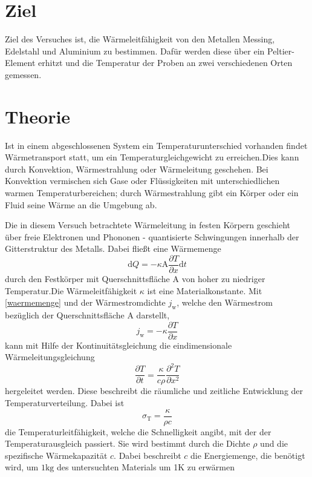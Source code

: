 \section{Ziel}
\label{sec:ziel}

Ziel des Versuches ist, die Wärmeleitfähigkeit von den Metallen Messing, Edelstahl und Aluminium zu bestimmen. Dafür werden diese über ein Peltier-Element erhitzt und die Temperatur der Proben an zwei verschiedenen Orten gemessen.

\section{Theorie}
\label{sec:theorie}

Ist in einem abgeschlossenen System ein Temperaturunterschied vorhanden findet Wärmetransport statt, um ein Temperaturgleichgewicht zu erreichen.Dies kann durch Konvektion, Wärmestrahlung oder Wärmeleitung geschehen. 
Bei Konvektion vermischen sich Gase oder Flüssigkeiten mit unterschiedlichen warmen Temperaturbereichen; durch Wärmestrahlung gibt ein Körper oder ein Fluid seine Wärme an die Umgebung ab.

Die in diesem Versuch betrachtete Wärmeleitung in festen Körpern geschieht über freie Elektronen und Phononen - quantisierte Schwingungen innerhalb der Gitterstruktur des Metalls.
Dabei fließt eine Wärmemenge
\begin{equation}
	\label{waermemenge}
	\mathup{d}Q=-\kappa\mathup{A}\frac{\partial{T}}{\partial{x}}\mathup{d}t
\end{equation}
durch den Festkörper mit Querschnittsfläche A von hoher zu niedriger Temperatur.Die Wärmeleitfähigkeit $\kappa$ ist eine Materialkonstante.
Mit \eqref{waermemenge} und der Wärmestromdichte $j_\mathup{w}$, welche den Wärmestrom bezüglich der Querschnittsfläche A darstellt,
\begin{equation}
	\label{waermestromdichte}
	j_\mathup{w}= -\kappa \frac{\partial{T}}{\partial{x}}
\end{equation}
kann mit Hilfe der Kontinuitätsgleichung die eindimensionale Wärmeleitungsgleichung
\begin{equation}
	\label{waermeleitungsgleichung}
	\frac{\partial{T}}{\partial{t}} =  \frac{\kappa}{c\rho}\frac{\partial^2{T}}{\partial{x^2}}
\end{equation}
hergeleitet werden.
Diese beschreibt die räumliche und zeitliche Entwicklung der Temperaturverteilung. 
Dabei ist
\begin{equation}
	\label{temperaturleitfaehigkeit}
	\sigma_\mathup{T}=\frac{\kappa}{{\rho}c}
\end{equation}
die Temperaturleitfähigkeit, welche die Schnelligkeit angibt, mit der der Temperaturausgleich passiert.
Sie wird bestimmt durch die Dichte $\rho$ und die spezifische Wärmekapazität $c$. Dabei beschreibt $c$ die Energiemenge, die benötigt wird, um $1\si{\kilo\gram}$ des untersuchten Materials um 1K zu erwärmen

